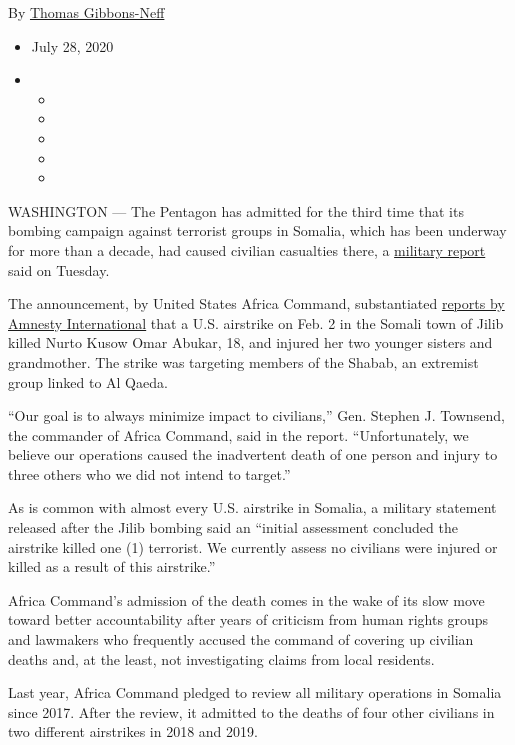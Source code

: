 By
\href{https://www.nytimes3xbfgragh.onion/by/thomas-gibbons-neff}{Thomas
Gibbons-Neff}

\begin{itemize}
\item
  July 28, 2020
\item
  \begin{itemize}
  \item
  \item
  \item
  \item
  \item
  \end{itemize}
\end{itemize}

WASHINGTON --- The Pentagon has admitted for the third time that its
bombing campaign against terrorist groups in Somalia, which has been
underway for more than a decade, had caused civilian casualties there, a
\href{https://www.africom.mil/civilian-casualty-report-and-allegations}{military
report} said on Tuesday.

The announcement, by United States Africa Command, substantiated
\href{https://www.amnestyusa.org/press-releases/zero-accountability-as-deaths-mount-in-somalia-from-u-s-strikes/}{reports
by Amnesty International} that a U.S. airstrike on Feb. 2 in the Somali
town of Jilib killed Nurto Kusow Omar Abukar, 18, and injured her two
younger sisters and grandmother. The strike was targeting members of the
Shabab, an extremist group linked to Al Qaeda.

``Our goal is to always minimize impact to civilians,'' Gen. Stephen J.
Townsend, the commander of Africa Command, said in the report.
``Unfortunately, we believe our operations caused the inadvertent death
of one person and injury to three others who we did not intend to
target.''

As is common with almost every U.S. airstrike in Somalia, a military
statement released after the Jilib bombing said an ``initial assessment
concluded the airstrike killed one (1) terrorist. We currently assess no
civilians were injured or killed as a result of this airstrike.''

Africa Command's admission of the death comes in the wake of its slow
move toward better accountability after years of criticism from human
rights groups and lawmakers who frequently accused the command of
covering up civilian deaths and, at the least, not investigating claims
from local residents.

Last year, Africa Command pledged to review all military operations in
Somalia since 2017. After the review, it admitted to the deaths of four
other civilians in two different airstrikes in 2018 and 2019.

